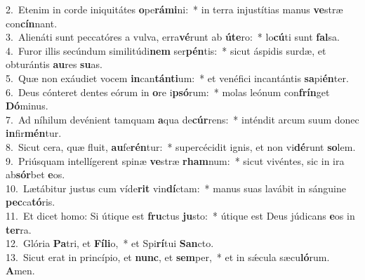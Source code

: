 {2.~}Etenim in corde iniquitátes \textbf{o}pe\textbf{rá}\textbf{mi}ni:~* in terra injustítias manus \textbf{ve}stræ con\textbf{cín}nant.\\
{3.~}Alienáti sunt peccatóres a vulva, erra\textbf{vé}runt ab \textbf{ú}\textbf{te}ro:~* lo\textbf{cú}ti sunt \textbf{fal}sa.\\
{4.~}Furor illis secúndum similitúdi\textbf{nem} ser\textbf{pén}tis:~* sicut áspidis surdæ, et obturántis \textbf{au}res \textbf{su}as.\\
{5.~}Quæ non exáudiet vocem \textbf{in}can\textbf{tán}\textbf{ti}um:~* et venéfici incantántis \textbf{sa}pi\textbf{én}ter.\\
{6.~}Deus cónteret dentes eórum in \textbf{o}re i\textbf{psó}rum:~* molas leónum con\textbf{frín}get \textbf{Dó}minus.\\
{7.~}Ad níhilum devénient tamquam \textbf{a}qua de\textbf{cúr}rens:~* inténdit arcum suum donec \textbf{in}fir\textbf{mén}tur.\\
{8.~}Sicut cera, quæ fluit, \textbf{au}fe\textbf{rén}tur:~* supercécidit ignis, et non vi\textbf{dé}runt \textbf{so}lem.\\
{9.~}Priúsquam intellígerent spinæ \textbf{ve}stræ \textbf{rham}num:~* sicut vivéntes, sic in ira ab\textbf{sór}bet \textbf{e}os.\\
{10.~}Lætábitur justus cum víde\textbf{rit} vin\textbf{dí}ctam:~* manus suas lavábit in sánguine \textbf{pec}ca\textbf{tó}ris.\\
{11.~}Et dicet homo: Si útique est \textbf{fru}ctus \textbf{ju}sto:~* útique est Deus júdicans \textbf{e}os in \textbf{ter}ra.\\
{12.~}Glória \textbf{Pa}tri, et \textbf{Fí}\textbf{li}o,~* et Spi\textbf{rí}tui \textbf{San}cto.\\
{13.~}Sicut erat in princípio, et \textbf{nunc}, et \textbf{sem}per,~* et in sǽcula sæcu\textbf{ló}rum. \textbf{A}men.\\
